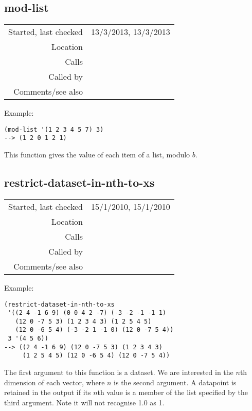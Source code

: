 \subsection*{mod-list}\label{fun:mod-list}

\vspace{0.3cm}
\begin{tabular}{r|p{8cm}}
Started, last checked & 13/3/2013, 13/3/2013 \\
Location & \nameref{sec:structural-induction-mod} \\
Calls & \\
Called by & \nameref{fun:segments2MNNs-mod12} \\
Comments/see also &
\end{tabular}

\vspace{0.5cm}
\noindent Example:
\begin{verbatim}
(mod-list '(1 2 3 4 5 7) 3)
--> (1 2 0 1 2 1)
\end{verbatim}

\noindent This function gives the value of each item
of a list, modulo $b$.


\subsection*{restrict-dataset-in-nth-to-xs}\label{fun:restrict-dataset-in-nth-to-xs}

\vspace{0.3cm}
\begin{tabular}{r|p{8cm}}
Started, last checked & 15/1/2010, 15/1/2010 \\
Location & \nameref{sec:structural-induction-mod} \\
Calls & \\
Called by & \\
Comments/see also &
\end{tabular}

\vspace{0.5cm}
\noindent Example:
\begin{verbatim}
(restrict-dataset-in-nth-to-xs
 '((2 4 -1 6 9) (0 0 4 2 -7) (-3 -2 -1 -1 1)
   (12 0 -7 5 3) (1 2 3 4 3) (1 2 5 4 5)
   (12 0 -6 5 4) (-3 -2 1 -1 0) (12 0 -7 5 4))
 3 '(4 5 6))
--> ((2 4 -1 6 9) (12 0 -7 5 3) (1 2 3 4 3)
     (1 2 5 4 5) (12 0 -6 5 4) (12 0 -7 5 4))
\end{verbatim}

\noindent The first argument to this function is a
dataset. We are interested in the $n$th dimension of
each vector, where $n$ is the second argument.
A datapoint is retained in the output if its $n$th
value is a member of the list specified by the third
argument. Note it will not recognise 1.0 as 1.


